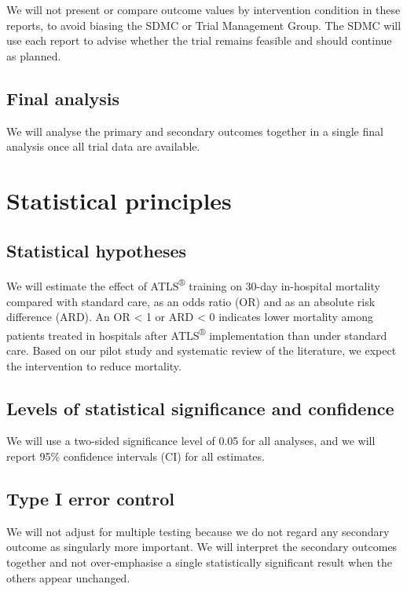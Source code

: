 \documentclass[
]{scrartcl}
\begin{document}
We will not present or compare outcome values by intervention condition
in these reports, to avoid biasing the SDMC or Trial Management Group.
The SDMC will use each report to advise whether the trial remains
feasible and should continue as planned.

\subsection{Final analysis}\label{sec-final-analysis}

We will analyse the primary and secondary outcomes together in a single
final analysis once all trial data are available.

\section{Statistical principles}\label{sec-statistical-principles}

\subsection{Statistical hypotheses}\label{sec-statistical-hypotheses}

We will estimate the effect of ATLS\textsuperscript{®} training on
30-day in-hospital mortality compared with standard care, as an odds
ratio (OR) and as an absolute risk difference (ARD). An OR \textless{} 1
or ARD \textless{} 0 indicates lower mortality among patients treated in
hospitals after ATLS\textsuperscript{®} implementation than under
standard care. Based on our pilot study and systematic review of the
literature, we expect the intervention to reduce mortality.

\subsection{Levels of statistical significance and
confidence}\label{sec-levels-of-statistical-significance-and-confidence}

We will use a two-sided significance level of 0.05 for all analyses, and
we will report 95\% confidence intervals (CI) for all estimates.

\subsection{Type I error control}\label{sec-type-i-error-control}

We will not adjust for multiple testing because we do not regard any
secondary outcome as singularly more important. We will interpret the
secondary outcomes together and not over-emphasise a single
statistically significant result when the others appear unchanged.
\end{document}
